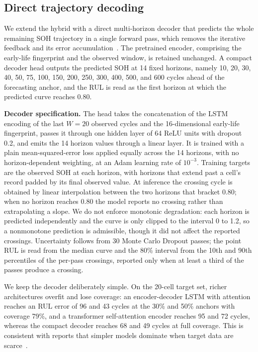 \subsection{Direct trajectory decoding}\label{sec:rul_direct}
We extend the hybrid with a direct multi-horizon decoder that predicts the whole remaining SOH
trajectory in a single forward pass, which removes the iterative feedback and its error
accumulation~\cite{seq2seq_rul, batterymformer}. The pretrained encoder, comprising the
early-life fingerprint and the observed window, is retained unchanged. A compact decoder head
outputs the predicted SOH at 14 fixed horizons, namely 10, 20, 30, 40, 50, 75, 100, 150, 200,
250, 300, 400, 500, and 600 cycles ahead of the forecasting anchor, and the RUL is read as the
first horizon at which the predicted curve reaches 0.80.

\textbf{Decoder specification.} The head takes the concatenation of the LSTM encoding of the
last $W=20$ observed cycles and the 16-dimensional early-life fingerprint, passes it through one
hidden layer of 64 ReLU units with dropout 0.2, and emits the 14 horizon values through a linear
layer. It is trained with a plain mean-squared-error loss applied equally across the 14 horizons,
with no horizon-dependent weighting, at an Adam learning rate of $10^{-3}$. Training targets are
the observed SOH at each horizon, with horizons that extend past a cell's record padded by its
final observed value. At inference the crossing cycle is obtained by linear interpolation between
the two horizons that bracket 0.80; when no horizon reaches 0.80 the model reports no crossing
rather than extrapolating a slope. We do not enforce monotonic degradation: each horizon is
predicted independently and the curve is only clipped to the interval 0 to 1.2, so a nonmonotone
prediction is admissible, though it did not affect the reported crossings. Uncertainty follows
from 30 Monte Carlo Dropout passes; the point RUL is read from the median curve and the 80\%
interval from the 10th and 90th percentiles of the per-pass crossings, reported only when at
least a third of the passes produce a crossing.

We keep the decoder deliberately simple. On the 20-cell target
set, richer architectures overfit and lose coverage: an encoder-decoder LSTM with attention
reaches an RUL error of 96 and 43 cycles at the 30\% and 50\% anchors with coverage 79\%, and a
transformer self-attention encoder reaches 95 and 72 cycles, whereas the compact decoder reaches
68 and 49 cycles at full coverage. This is consistent with reports that simpler models dominate
when target data are scarce~\cite{cnn_robust}.

